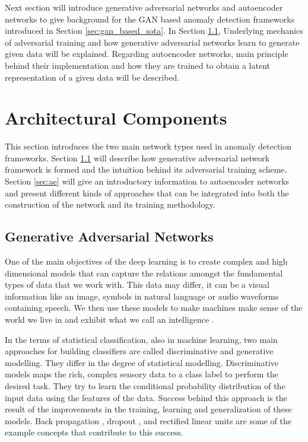 {Next section will introduce generative adversarial networks and autoencoder networks to give background for the 
GAN based anomaly detection frameworks introduced in Section \ref{sec:gan_based_sota}. In Section \ref{sec:gan}, Underlying mechanics of 
adversarial training and how generative adversarial networks learn to generate given data will be explained. Regarding 
autoencoder networks, main principle behind their implementation and how they are trained to obtain a latent representation of a given 
data will be described.


\section{Architectural Components}
\label{sec:arch_comp}
This section introduces the two main network types used in  anomaly detection
frameworks. Section \ref{sec:gan} will describe how generative adversarial network
framework is formed and the intuition behind its adversarial training scheme. Section 
\ref{sec:ae} will give an introductory information to autoencoder networks and present different kinds of
approaches that can be integrated into both the construction of the network and its training
methodology. 

\subsection{Generative Adversarial Networks}
\label{sec:gan}

One of the main objectives of the deep learning is to create complex and high dimensional
models that can capture the relations amongst the fundamental types of data that we work with. 
This data may differ, it can be a visual information like an image,
symbols in natural language or audio waveforms containing speech. We then use these models to make
machines make sense of the world we live in and exhibit what we call an intelligence
\cite{Bengio:2009:LDA:1658423.1658424}.

In the terms of statistical classification, also in machine learning, two main approaches for building 
classifiers are called discriminative and generative modelling. They differ in the degree of statistical 
modelling\cite{gdjabra}. Discriminative models maps the rich, complex sensory data to a class label to
perform the desired task. They try to learn the conditional probability distribution of the input
data using the features of the data. Success behind this approach is the result of the
improvements in the training, learning and generalization of these models. Back propagation
\cite{Widrow2008AppendixGT}, dropout \cite{Srivastava2014DropoutAS}, and rectified linear
units\cite{Glorot2011DeepSR} are some of the example concepts that contribute to this success.

}
